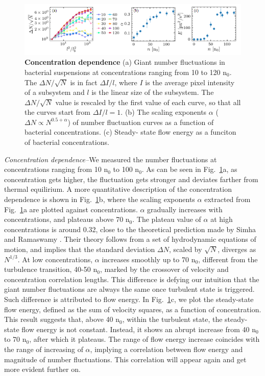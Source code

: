 \documentclass[twocolumn,aps,prl,amsmath,amssymb,longbibliography]{revtex4-1}
\begin{document}
\begin{figure}[!]
\begin{center}
\includegraphics[width=\textwidth]{figures/fig-3-v3.png}
\caption[]{\textbf{Concentration dependence} (a) Giant number fluctuations in bacterial suspensions at concentrations ranging from 10 to 120 n$_0$. The $\Delta N/\sqrt{N}$ is in fact $\Delta I/l$, where $I$ is the average pixel intensity of a subsystem and $l$ is the linear size of the subsystem. The $\Delta N/\sqrt{N}$ value is rescaled by the first value of each curve, so that all the curves start from $\Delta I/l=1$. (b) The scaling exponents $\alpha$ ($\Delta N \propto N^{0.5+\alpha}$) of number fluctuation curves as a function of bacterial concentrations. (c) Steady- state flow energy as a funciton of bacterial concentrations.}
\label{fig:3}
\end{center}
\end{figure}
\textit{Concentration dependence--}We measured the number fluctuations at concentrations ranging from 10 n$_0$ to 100 n$_0$. As can be seen in Fig.~\ref{fig:3}a, as concentration gets higher, the fluctuation gets stronger and deviates farther from thermal equilirium. A more quantitative description of the concentration dependence is shown in Fig.~\ref{fig:3}b, where the scaling exponents $\alpha$ extracted from Fig.~\ref{fig:3}a are plotted against concentrations. $\alpha$ gradually increases with concentrations, and plateaus above 70 n$_0$. The plateau value of $\alpha$ at high concentrations is around 0.32, close to the theoretical prediction made by Simha and Ramaswamy \cite{PhysRevLett.89.058101}. Their theory follows from a set of hydrodynamic equations of motion, and implies that the standard deviation $\Delta N$, scaled by
$\sqrt N$, diverges as $N^{1/3}$. At low concentrations, $\alpha$ increases smoothly up to 70 n$_0$, different from the turbulence transition, 40-50 n$_0$, marked by the crossover of velocity and concentration correlation lengths. This difference is defying our intuition that the giant number fluctuations are always the same once turbulent state is triggered. Such difference is attributed to flow energy. In Fig.~\ref{fig:3}c, we plot the steady-state flow energy, defined as the sum of velocity squares, as a function of concentration. This result suggests that, above 40 n$_0$, within the turbulent state, the steady-state flow energy is not constant. Instead, it shows an abrupt increase from 40 n$_0$ to 70 n$_0$, after which it plateaus. The range of flow energy increase coincides with the range of increasing of $\alpha$, implying a correlation between flow energy and magnitude of number fluctuations. This correlation will appear again and get more evident further on.
\end{document}
